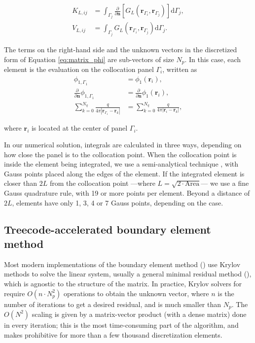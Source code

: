 \begin{align} \label{eq:layers_element}
K_{L,ij} &= \int_{\Gamma_j} \frac{\partial}{\partial \mathbf{n}} \left[ G_L(\mathbf{r}_{\Gamma_i},\mathbf{r}_{\Gamma_j}) \right]\mathrm{d} \Gamma_j, \nonumber \\
V_{L,ij} &= \int_{\Gamma_j} G_L(\mathbf{r}_{\Gamma_i},\mathbf{r}_{\Gamma_j})  \mathrm{d} \Gamma_j.
\end{align}

The terms on the right-hand side and the unknown vectors in the discretized form of Equation \eqref{eq:matrix_phi} are sub-vectors of size $N_p$. In this case, each element is the evaluation on the collocation panel $\Gamma_i$, written as
%
\begin{align} \label{eq:vector_disc}
\phi_{1,\Gamma_1} &= \phi_1(\mathbf{r}_i), \nonumber \\
\frac{\partial}{\partial \mathbf{n}}\phi_{1,\Gamma_1} &= \frac{\partial}{\partial \mathbf{n}}\phi_1(\mathbf{r}_i), \nonumber \\
\sum_{k=0}^{N_q} \frac{q}{4\pi|\mathbf{r}_{\Gamma_1} - \mathbf{r}_k|} &= \sum_{k=0}^{N_q} \frac{q}{4\pi|\mathbf{r}_i - \mathbf{r}_k|},
\end{align}

\noindent where $\mathbf{r}_i$ is located at the center of panel $\Gamma_i$.

In our numerical solution, integrals are calculated in three ways, depending on how close the panel is to the collocation point. When the collocation point is inside the element being integrated, we use a semi-analytical technique \cite{ZhuHuangSongWhite2001}, with Gauss points placed along the edges of the element. If the integrated element is closer than $2L$ from the collocation point ---where $L = \sqrt{2\cdot \text{Area}}$--- we use a fine Gauss quadrature rule, with 19 or more points per element. Beyond a distance of $2L$, elements have only 1, 3, 4 or 7 Gauss points, depending on the case.

\subsection{Treecode-accelerated boundary element method}

Most modern implementations of the boundary element method (\bem) use Krylov methods to solve the linear system, usually a general minimal residual method (\gmres), which is agnostic to the structure of the matrix. In practice, Krylov solvers for \bem require $O(n \cdot N_p^2)$ operations to obtain the unknown vector, where $n$ is the number of iterations to get a desired residual, and is much smaller than $N_p$. The $O(N^2)$ scaling is given by a matrix-vector product (with a dense matrix) done in every iteration; this is the most time-consuming part of the algorithm, and makes \bem prohibitive for more than a few thousand discretization elements. 

